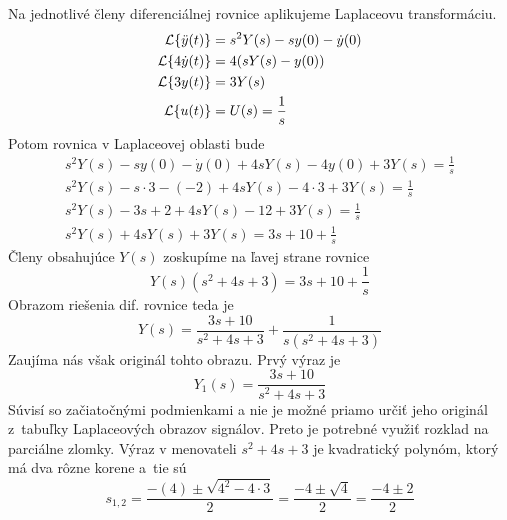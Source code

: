 \documentclass[a4paper, 10pt, ]{article}
\begin{document}
\begin{itemize}[leftmargin=0pt, labelsep=3mm, itemsep=0pt]
    Na jednotlivé členy diferenciálnej rovnice aplikujeme Laplaceovu transformáciu.
    \begin{subequations}
        \begin{align}
            \mathcal{L}{\left\{\ddot y(t)\right\}} &= s^2 Y(s) - s y(0) - \dot y(0) \\
            \mathcal{L}{\left\{4 \dot y(t)\right\}} &= 4 (s Y(s) - y(0)) \\
            \mathcal{L}{\left\{3 y(t)\right\}} &= 3 Y(s) \\
            \mathcal{L}{\left\{u(t)\right\}} &= U(s) = \frac{1}{s}
        \end{align}
    \end{subequations}
    Potom rovnica v Laplaceovej oblasti bude
    \begin{subequations}
        \begin{align}
            s^2 Y(s) - s y(0) - \dot y(0) + 4 s Y(s) - 4 y(0) + 3 Y(s) = \frac{1}{s} \\
            s^2 Y(s) - s \cdot 3 - (-2) + 4 s Y(s) - 4 \cdot 3 + 3 Y(s) = \frac{1}{s} \\
            s^2 Y(s) - 3 s + 2 + 4 s Y(s) - 12 + 3 Y(s) = \frac{1}{s} \\
            s^2 Y(s) + 4 s Y(s) + 3 Y(s) = 3 s + 10 + \frac{1}{s}
        \end{align}
    \end{subequations}
    Členy obsahujúce $Y(s)$ zoskupíme na ľavej strane rovnice
    \begin{equation}
        Y(s) (s^2 + 4 s + 3) = 3 s + 10 + \frac{1}{s}
    \end{equation}
    Obrazom riešenia dif. rovnice teda je
    \begin{equation}
        Y(s) = \frac{3 s + 10}{s^2 + 4 s + 3} + \frac{1}{s(s^2 + 4 s + 3)}
    \end{equation}
    Zaujíma nás však originál tohto obrazu. Prvý výraz je
    \begin{equation}
        Y_1(s) = \frac{3 s + 10}{s^2 + 4 s + 3}
    \end{equation}
    Súvisí so začiatočnými podmienkami a nie je možné priamo určiť jeho originál z~tabuľky Laplaceových obrazov signálov. Preto je potrebné využiť rozklad na parciálne zlomky. Výraz v menovateli $s^2 + 4 s + 3$ je kvadratický polynóm, ktorý má dva rôzne korene a~tie sú
    \begin{equation}
        s_{1,2} = \frac{-(4) \pm \sqrt{4^2 - 4 \cdot 3}}{2} = \frac{-4 \pm \sqrt{4}}{2} = \frac{-4 \pm 2}{2}
    \end{equation}

\end{itemize}
\end{document}
